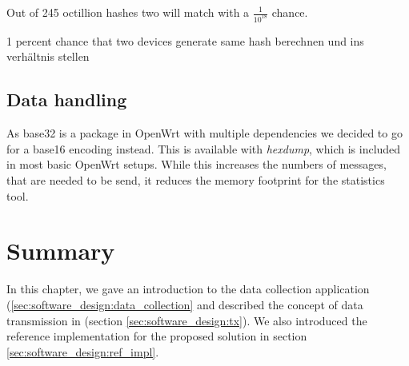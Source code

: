      Out of 245 octillion hashes two will match with a $\frac{1}{10^18}$ chance. 
     
     1 percent chance that two devices generate same hash
     berechnen und ins verhältnis stellen
     
     
% 
\subsection{Data handling}
    As base32 is a package in OpenWrt with multiple dependencies we decided to go for a base16 encoding instead. This is available with \textit{hexdump}, which is included in most basic OpenWrt setups. While this increases the numbers of messages, that are needed to be send, it reduces the memory footprint for the statistics tool.
\section{Summary}

In this chapter, we gave an introduction to the data collection application (\ref{sec:software_design:data_collection} and described the concept of data transmission in (section \ref{sec:software_design:tx}).
We also introduced the reference implementation for the proposed solution in section \ref{sec:software_design:ref_impl}. 
%